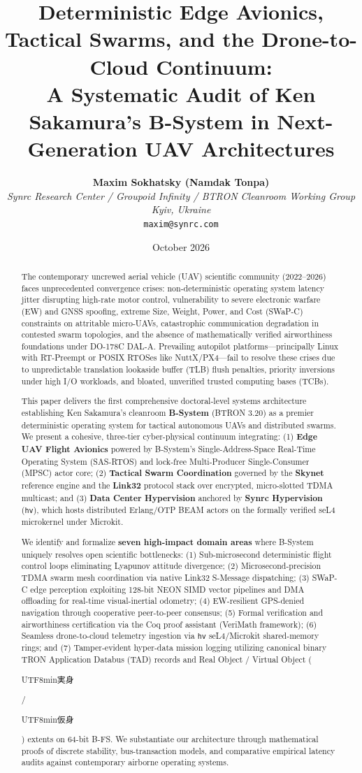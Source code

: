 \documentclass[10pt,journal,compsoc,twocolumn]{article}
\title{\LARGE \textbf{Deterministic Edge Avionics, Tactical Swarms, and the Drone-to-Cloud Continuum:\\A Systematic Audit of Ken Sakamura's B-System in Next-Generation UAV Architectures}}
\author{
    \textbf{Maxim Sokhatsky (Namdak Tonpa)}\\[0.3em]
    \small \textit{Synrc Research Center / Groupoid Infinity / BTRON Cleanroom Working Group}\\
    \small \textit{Kyiv, Ukraine}\\
    \small \texttt{maxim@synrc.com}
}
\date{October 2026}
\newcommand{\ja}[1]{\begin{CJK*}{UTF8}{min}#1\end{CJK*}}
\begin{document}
\maketitle

\begin{abstract}
The contemporary uncrewed aerial vehicle (UAV) scientific community (2022--2026) faces unprecedented convergence crises: non-deterministic operating system latency jitter disrupting high-rate motor control, vulnerability to severe electronic warfare (EW) and GNSS spoofing, extreme Size, Weight, Power, and Cost (SWaP-C) constraints on attritable micro-UAVs, catastrophic communication degradation in contested swarm topologies, and the absence of mathematically verified airworthiness foundations under DO-178C DAL-A. Prevailing autopilot platforms—principally Linux with RT-Preempt or POSIX RTOSes like NuttX/PX4—fail to resolve these crises due to unpredictable translation lookaside buffer (TLB) flush penalties, priority inversions under high I/O workloads, and bloated, unverified trusted computing bases (TCBs).

This paper delivers the first comprehensive doctoral-level systems architecture establishing Ken Sakamura's cleanroom \textbf{B-System} (BTRON 3.20) as a premier deterministic operating system for tactical autonomous UAVs and distributed swarms. We present a cohesive, three-tier cyber-physical continuum integrating: (1) \textbf{Edge UAV Flight Avionics} powered by B-System's Single-Address-Space Real-Time Operating System (SAS-RTOS) and lock-free Multi-Producer Single-Consumer (MPSC) actor core; (2) \textbf{Tactical Swarm Coordination} governed by the \textbf{Skynet} reference engine and the \textbf{Link32} protocol stack over encrypted, micro-slotted TDMA multicast; and (3) \textbf{Data Center Hypervision} anchored by \textbf{Synrc Hypervision} (\texttt{hv}), which hosts distributed Erlang/OTP BEAM actors on the formally verified seL4 microkernel under Microkit.

We identify and formalize \textbf{seven high-impact domain areas} where B-System uniquely resolves open scientific bottlenecks: (1) Sub-microsecond deterministic flight control loops eliminating Lyapunov attitude divergence; (2) Microsecond-precision TDMA swarm mesh coordination via native Link32 S-Message dispatching; (3) SWaP-C edge perception exploiting 128-bit NEON SIMD vector pipelines and DMA offloading for real-time visual-inertial odometry; (4) EW-resilient GPS-denied navigation through cooperative peer-to-peer consensus; (5) Formal verification and airworthiness certification via the Coq proof assistant (VeriMath framework); (6) Seamless drone-to-cloud telemetry ingestion via \texttt{hv} seL4/Microkit shared-memory rings; and (7) Tamper-evident hyper-data mission logging utilizing canonical binary TRON Application Databus (TAD) records and Real Object / Virtual Object (\ja{実身}/\ja{仮身}) extents on 64-bit B-FS. We substantiate our architecture through mathematical proofs of discrete stability, bus-transaction models, and comparative empirical latency audits against contemporary airborne operating systems.
\end{abstract}
\end{document}
